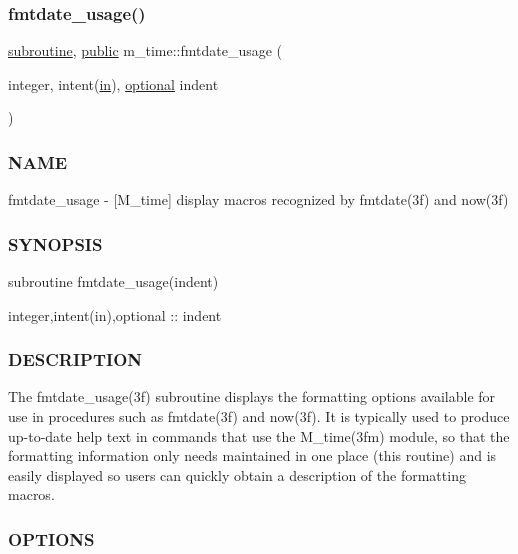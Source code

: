 \subsubsection{\texorpdfstring{fmtdate\+\_\+usage()}{fmtdate\_usage()}}
{\footnotesize\ttfamily \hyperlink{M__stopwatch_83_8txt_acfbcff50169d691ff02d4a123ed70482}{subroutine}, \hyperlink{M__stopwatch_83_8txt_a2f74811300c361e53b430611a7d1769f}{public} m\+\_\+time\+::fmtdate\+\_\+usage (\begin{DoxyParamCaption}\item[{integer, intent(\hyperlink{M__journal_83_8txt_afce72651d1eed785a2132bee863b2f38}{in}), \hyperlink{option__stopwatch_83_8txt_aa4ece75e7acf58a4843f70fe18c3ade5}{optional}}]{indent }\end{DoxyParamCaption})}



\subsubsection*{N\+A\+ME}

fmtdate\+\_\+usage -\/ \mbox{[}M\+\_\+time\mbox{]} display macros recognized by fmtdate(3f) and now(3f) 

\subsubsection*{S\+Y\+N\+O\+P\+S\+IS}

\begin{DoxyVerb}subroutine fmtdate_usage(indent)

 integer,intent(in),optional      :: indent
\end{DoxyVerb}


\subsubsection*{D\+E\+S\+C\+R\+I\+P\+T\+I\+ON}

\begin{DoxyVerb} The fmtdate_usage(3f) subroutine displays the formatting options
 available for use in procedures such as fmtdate(3f) and now(3f).
 It is typically used to produce up-to-date help text in commands
 that use the M_time(3fm) module, so that the formatting information
 only needs maintained in one place (this routine) and is easily
 displayed so users can quickly obtain a description of the formatting
 macros.
\end{DoxyVerb}


\subsubsection*{O\+P\+T\+I\+O\+NS}

